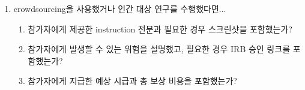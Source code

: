 \documentclass{article}
\begin{document}
\begin{enumerate}
\item crowdsourcing을 사용했거나 인간 대상 연구를 수행했다면...
\begin{enumerate}
  \item 참가자에게 제공한 instruction 전문과 필요한 경우 스크린샷을 포함했는가?
    \answerNA{}
  \item 참가자에게 발생할 수 있는 위험을 설명했고, 필요한 경우 IRB 승인 링크를 포함했는가?
    \answerNA{}
  \item 참가자에게 지급한 예상 시급과 총 보상 비용을 포함했는가?
    \answerNA{}
\end{enumerate}

\end{enumerate}


\newpage

\appendix


\end{document}
